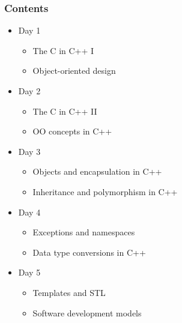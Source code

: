 \documentclass{slides}
\begin{document}
\begin{frame}
  \frametitle{Contents}
  \begin{itemize}
  \item Day 1
    \begin{itemize}
    \item The C in C++ I
    \item Object-oriented design
    \end{itemize}
  \item Day 2
    \begin{itemize}
    \item The C in C++ II
    \item OO concepts in C++
    \end{itemize}
  \item Day 3
    \begin{itemize}
    \item Objects and encapsulation in C++
    \item Inheritance and polymorphism in C++
    \end{itemize}
    \item Day 4
      \begin{itemize}
      \item Exceptions and namespaces
      \item Data type conversions in C++
      \end{itemize}
    \item Day 5
      \begin{itemize}
      \item Templates and STL
      \item Software development models
      \end{itemize}
  \end{itemize}
\end{frame}
\end{document}
